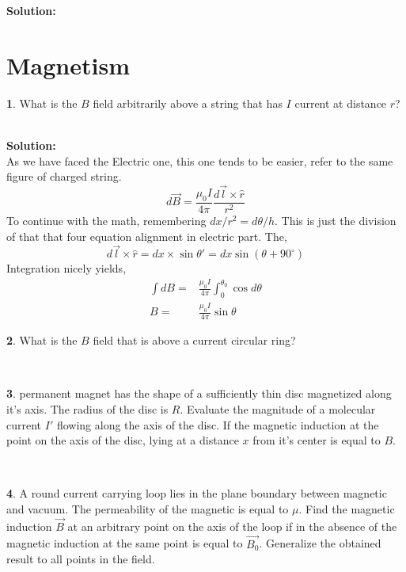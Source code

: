 \documentclass[a4paper]{article}
\theoremstyle{definition}
\newtheorem{prob}{ \framebox[0.09\textwidth]{{\sffamily Pr}} }
\newcommand{\pr}[1]{ \begin{tcolorbox} \begin{prob} 
    #1 
\end{prob} 
   \end{tcolorbox}\ 
   \\
 }
\begin{document}
\textbf{Solution:} \\












\section{\textsf{Magnetism}}
\pr{   
What is the $B$ field arbitrarily above a string that has $I$ current at distance $r$? 
}

\textbf{Solution:} \\ As we have faced the Electric one, this one tends to be easier, refer to the same figure of charged string. 
\begin{equation}
d \vec{B} = \frac{\mu _0 I}{4 \pi} \frac{ d \vec{l} \times \hat{r}} {r^2}
\end{equation}
To continue with the math, remembering $dx/r^2 = d \theta / h$. This is just the division of that that four equation alignment in electric part. The, \[d \vec{l} \times \hat{r} = dx \times \sin \theta ' = dx \sin (\theta + 90^{\circ} ) \]
Integration nicely yields, 
\begin{align*}
\int dB =& \frac{\mu _0 I}{4 \pi} \int_{0}^{\theta _0} \cos d \theta \\
B=& \frac{\mu _0 I}{4 \pi} \sin \theta
\end{align*}
\pr{    
What is the $B$ field that is above a current circular ring? 
}
\pr{
permanent magnet has the shape of a sufficiently thin disc magnetized along it's axis. The radius of
the disc is $R$. Evaluate the magnitude of a molecular current $I'$ flowing along the axis of the disc.
If the magnetic induction at the point on the axis of the disc, lying at a distance $x$ from it's center is equal to $B$. 
}
\pr{
A round current carrying loop lies in the plane boundary between magnetic and vacuum. The permeability of the magnetic is
equal to $\mu$. Find the magnetic induction $\vec{B}$ at an arbitrary point on the axis of the loop if in the absence of the magnetic
induction at the same point is equal to $\vec{B_0}$. Generalize the obtained result to all points in the field.
}
\end{document}
